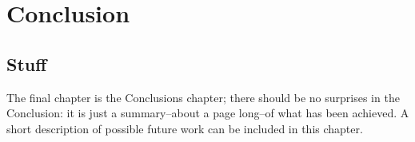 
\chapter{Conclusion} %

\label{Conclusion} %


\section{Stuff}
The final chapter is the
Conclusions chapter; there should be no surprises in the Conclusion: it is just a summary--about a
page long--of what has been achieved. A short description of possible future work can be
included in this chapter.